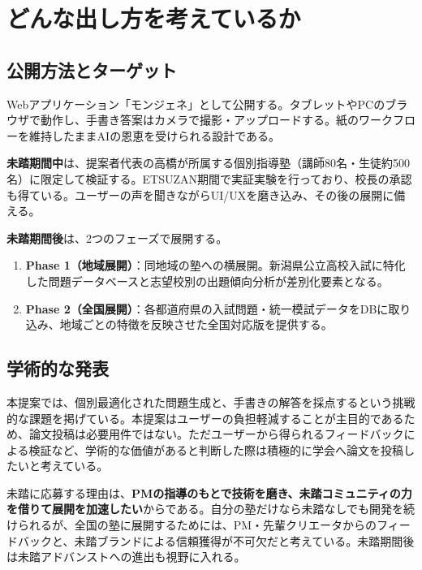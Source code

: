 \documentclass[paper=a4,fontsize=10.5bp,jafontsize=10.5bp,twocolumn]{jlreq}
\begin{document}
\section{どんな出し方を考えているか}

\subsection{公開方法とターゲット}

Webアプリケーション「モンジェネ」として公開する。タブレットやPCのブラウザで動作し、手書き答案はカメラで撮影・アップロードする。紙のワークフローを維持したままAIの恩恵を受けられる設計である。

\textbf{未踏期間中}は、提案者代表の高橋が所属する個別指導塾（講師80名・生徒約500名）に限定して検証する。ETSUZAN期間で実証実験を行っており、校長の承認も得ている。ユーザーの声を聞きながらUI/UXを磨き込み、その後の展開に備える。

\textbf{未踏期間後}は、2つのフェーズで展開する。

\begin{enumerate}[leftmargin=2em]
  \item \textbf{Phase 1（地域展開）}：同地域の塾への横展開。新潟県公立高校入試に特化した問題データベースと志望校別の出題傾向分析が差別化要素となる。
  \item \textbf{Phase 2（全国展開）}：各都道府県の入試問題・統一模試データをDBに取り込み、地域ごとの特徴を反映させた全国対応版を提供する。
\end{enumerate}

\subsection{学術的な発表}

本提案では、個別最適化された問題生成と、手書きの解答を採点するという挑戦的な課題を掲げている。本提案はユーザーの負担軽減することが主目的であるため、論文投稿は必要用件ではない。ただユーザーから得られるフィードバックによる検証など、学術的な価値があると判断した際は積極的に学会へ論文を投稿したいと考えている。

未踏に応募する理由は、\textbf{PMの指導のもとで技術を磨き、未踏コミュニティの力を借りて展開を加速したい}からである。自分の塾だけなら未踏なしでも開発を続けられるが、全国の塾に展開するためには、PM・先輩クリエータからのフィードバックと、未踏ブランドによる信頼獲得が不可欠だと考えている。未踏期間後は未踏アドバンストへの進出も視野に入れる。
\end{document}
